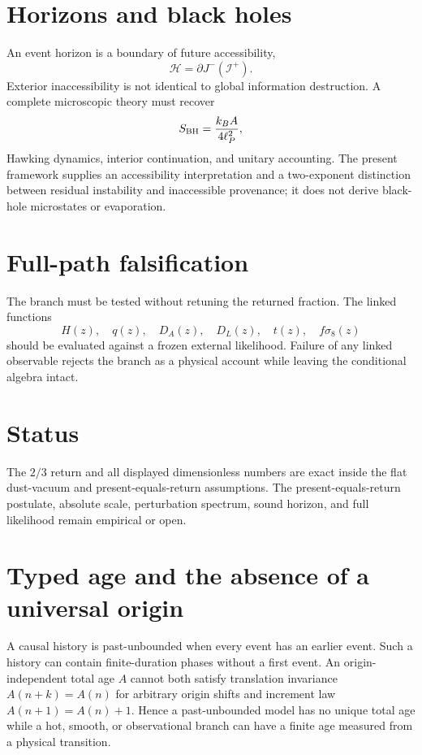 \documentclass[11pt,a4paper]{article}
\begin{document}
\section{Horizons and black holes}
An event horizon is a boundary of future accessibility,
\begin{equation}
\mathcal H=\partial J^-(\mathcal I^+).
\end{equation}
Exterior inaccessibility is not identical to global information destruction. A complete microscopic theory must recover
\begin{equation}
S_{\rm BH}=\frac{k_BA}{4\ell_P^2},
\end{equation}
Hawking dynamics, interior continuation, and unitary accounting. The present framework supplies an accessibility interpretation and a two-exponent distinction between residual instability and inaccessible provenance; it does not derive black-hole microstates or evaporation.

\section{Full-path falsification}
The branch must be tested without retuning the returned fraction. The linked functions
\begin{equation}
H(z),\quad q(z),\quad D_A(z),\quad D_L(z),\quad t(z),\quad f\sigma_8(z)
\end{equation}
should be evaluated against a frozen external likelihood. Failure of any linked observable rejects the branch as a physical account while leaving the conditional algebra intact.

\section{Status}
The $2/3$ return and all displayed dimensionless numbers are exact inside the flat dust-vacuum and present-equals-return assumptions. The present-equals-return postulate, absolute scale, perturbation spectrum, sound horizon, and full likelihood remain empirical or open.


\section{Typed age and the absence of a universal origin}
A causal history is past-unbounded when every event has an earlier event. Such a history can contain finite-duration phases without a first event. An origin-independent total age $A$ cannot both satisfy translation invariance $A(n+k)=A(n)$ for arbitrary origin shifts and increment law $A(n+1)=A(n)+1$. Hence a past-unbounded model has no unique total age while a hot, smooth, or observational branch can have a finite age measured from a physical transition.
\end{document}
